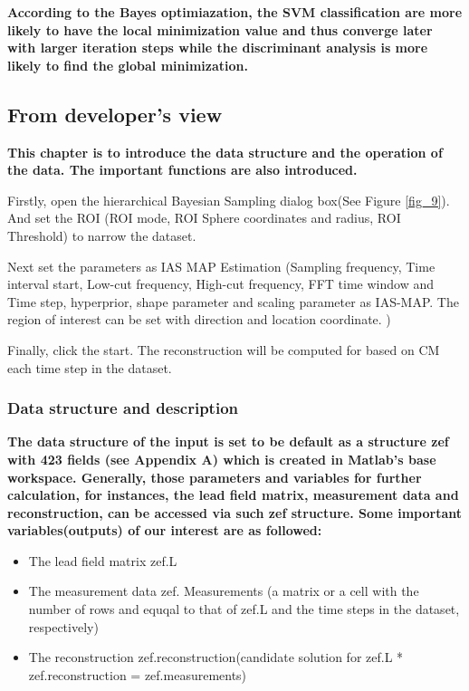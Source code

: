 \documentclass[5p]{elsarticle}
\begin{document}
\begin{frontmatter}
\bf According to the Bayes optimiazation, the SVM classification are more likely to have the local minimization value and thus converge later with larger iteration steps while the discriminant analysis is more likely to find the global minimization. 

\subsection{From developer's view}
\bf This chapter is to introduce the data structure and the operation of the data. The important functions are also introduced.

Firstly, open the hierarchical Bayesian Sampling dialog box(See Figure \ref{fig_9}). And set the ROI (ROI mode, ROI Sphere coordinates and radius, ROI Threshold) to narrow the dataset.

Next set the parameters as IAS MAP Estimation (Sampling frequency, Time interval start, Low-cut frequency, High-cut frequency, FFT time window and Time step, hyperprior, shape parameter and scaling parameter as IAS-MAP. The region of interest can be set with direction and location coordinate. ) 

Finally, click the start. The reconstruction will be computed for  based on CM each time step in the dataset.


\subsubsection{Data structure and description}
\bf The data structure of the input is set to be default as a structure zef with 423 fields (see Appendix A) which is created in Matlab’s base workspace. Generally, those parameters and variables for further calculation, for instances, the lead field matrix, measurement data and reconstruction, can be accessed via such zef structure.
Some important variables(outputs) of our interest are as followed:

\begin{itemize}
\item	The lead field matrix zef.L
\item	The measurement data zef. Measurements (a matrix or a cell with the number of rows and equqal to that  of zef.L and the time steps in the dataset, respectively)
\item	The reconstruction zef.reconstruction(candidate solution for zef.L * zef.reconstruction = zef.measurements)
\end{itemize}


\end{frontmatter}
\end{document}
